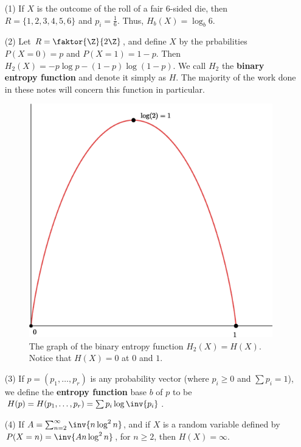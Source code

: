 \begin{example}
    \begin{enumerate}
        \item[(1)] If $X$ is the outcome of the roll of a fair $6$-sided die,
        then $R=\{1,2,3,4,5,6\}$ and $p_i=\frac{1}{6}$. Thus,
        $H_b(X)=\log_b{6}$.

    \item[(2)] Let $R=\faktor{\Z}{2\Z}$, and define $X$ by the prbabilities
        $P(X=0)=p$ and $P(X=1)=1-p$. Then $H_2(X)=-p\log{p}-(1-p)\log{(1-p)}$.
        We call $H_2$ the \textbf{binary entropy function} and denote it simply
        as $H$. The majority of the work done in these notes will concern this
        function in particular.

        \begin{figure}
            \centering
            \includegraphics[scale=0.3]{Figures/Chapter2/binary_entropy.eps}
            \caption{The graph of the binary entropy function $H_2(X)=H(X)$.
            Notice that $H(X)=0$ at $0$ and  $1$.}
            \label{fig_2.1}
        \end{figure}

    \item[(3)] If $p=(p_1, \dots, p_r)$ is any probability vector (where $p_i
        \geq 0$ and  $\sum{p_i}=1$), we define the \textbf{entropy function}
        base $b$ of  $p$ to be  $H(p)=H(p_1, \dots,
        p_r)=\sum{p_i\log{\inv{p_i}}}$.

    \item[(4)] If $A=\sum_{n=2}^{\infty}{\inv{n\log^2{n}}}$, and if $X$ is a
        random variable defined by  $P(X=n)=\inv{An\log^2{n}}$, for $n \geq 2$,
        then  $H(X)=\infty$.
    \end{enumerate}
\end{example}


